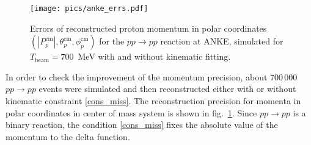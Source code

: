 






\begin{figure}[htbp]\centering
\texttt{[image: pics/anke\_errs.pdf]}
\caption{
Errors of reconstructed proton momentum in polar coordinates $(|P_p^\mathrm{cm}|, \theta_p^\mathrm{cm}, \phi_p^\mathrm{cm})$ for the $pp \to pp$ reaction at ANKE, simulated for $T_\mathrm{beam} = 700$~MeV with and without kinematic fitting.
}
\label{anke_errs}
\end{figure}

In order to check the improvement of the momentum precision, about 700\,000 $pp \to pp$ events were simulated and then reconstructed either with or without kinematic constraint \eqref{cons_miss}.
The reconstruction precision for momenta in polar coordinates in center of mass system is shown in fig.~\ref{anke_errs}.
Since $pp \to pp$ is a binary reaction, the condition \eqref{cons_miss} fixes the absolute value of the momentum to the delta function.


